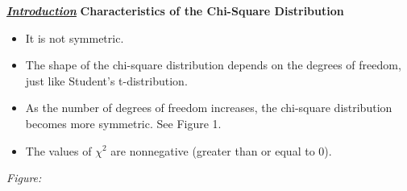 \documentclass{report}
\begin{document}
    \pagebreak \bigbreak \noindent 
    \textbf{\textit{\underline{Introduction}}}
    \bigbreak \noindent 
    \textbf{Characteristics of the Chi-Square Distribution}
    \begin{itemize}
        \item It is not symmetric.
        \item The shape of the chi-square distribution depends on the degrees of freedom, just like Student's t-distribution.
        \item As the number of degrees of freedom increases, the chi-square distribution becomes more symmetric. See Figure 1.
        \item The values of $\chi^2$ are nonnegative (greater than or equal to 0).
    \end{itemize}
    \bigbreak \noindent 
    \textit{Figure:}
    \bigbreak \noindent 
\begin{figure}[ht]
    \centering
    \label{fig:chisquare}
\end{figure}
\end{document}
